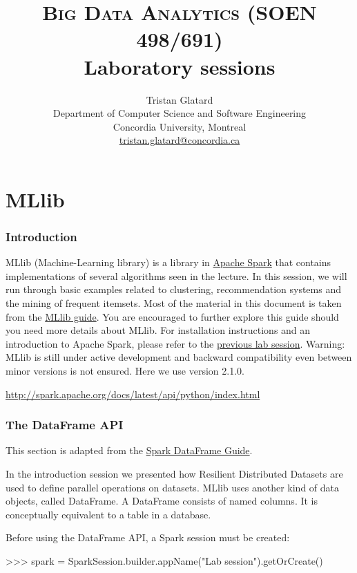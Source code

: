 \documentclass[11pt]{article}
\title{\textsc{Big Data Analytics (SOEN 498/691)} \\ Laboratory sessions}
\author{Tristan Glatard\\Department of Computer Science and Software Engineering\\Concordia University, Montreal\\\href{mailto:tristan.glatard@concordia.ca}{tristan.glatard@concordia.ca}}
\begin{document}
\maketitle

\newpage

\tableofcontents

\newpage

\part{MLlib}

\section{Introduction}

MLlib (Machine-Learning library) is a library in
\href{http://spark.apache.org}{Apache Spark} that contains
implementations of several algorithms seen in the lecture. In this
session, we will run through basic examples related to clustering,
recommendation systems and the mining of frequent itemsets.  Most of
the material in this document is taken from the
\href{http://spark.apache.org/docs/latest/ml-guide.html}{MLlib
  guide}. You are encouraged to further explore this guide should you
need more details about MLlib. For installation instructions and an
introduction to Apache Spark, please refer to the
\href{https://github.com/glatard/big-data-analytics-course/releases/download/0.8/spark.pdf}{previous
  lab session}. Warning: MLlib is still under active development and
backward compatibility even between minor versions is not
ensured. Here we use version 2.1.0. 

\href{Pyspark documentation}{http://spark.apache.org/docs/latest/api/python/index.html}

\section{The DataFrame API}

This section is adapted from the
\href{http://spark.apache.org/docs/latest/sql-programming-guide.html}{Spark
  DataFrame Guide}.

In the introduction session we presented how Resilient Distributed
Datasets are used to define parallel operations on datasets. MLlib
uses another kind of data objects, called DataFrame. A DataFrame
consists of named columns. It is conceptually equivalent to a table in
a database.

Before using the DataFrame API, a Spark session must be created:
\begin{cli}
  >>> spark = SparkSession.builder.appName("Lab session").getOrCreate()
\end{cli}
\end{document}
